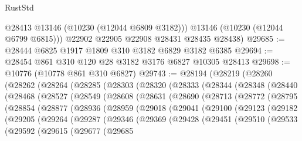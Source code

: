 \begin{lexlean}{RustStd}
\begin{coremodule}
          @28413
          @13146
          (@10230 (@12044 @6809 @3182)))
        @13146
        (@10230 (@12044 @6799 @6815)))
      @22902
      @22905
      @22908
      @28431
      @28435
      @28438)
@29685 := @28444 @6825 @1917 @1809 @310 @3182 @6829 @3182 @6385
@29694 := @28454 @861 @310 @120 @28 @3182 @3176 @6827 @10305 @28413
@29698 := @10776 (@10778 @861 @310 @6827)
@29743 := @28194
    (@28219
      (@28260
        (@28262
          (@28264
            (@28285
              (@28303
                (@28320
                  (@28333
                    (@28344
                      (@28348
                        (@28440
                          (@28468
                            (@28527
                              (@28549
                                (@28608
                                  (@28631
                                    (@28690
                                      (@28713
                                        (@28772
                                          (@28795
                                            (@28854
                                              (@28877
                                                (@28936
                                                  (@28959
                                                    (@29018
                                                      (@29041
                                                        (@29100
                                                          (@29123
                                                            (@29182
                                                              (@29205
                                                                (@29264
                                                                  (@29287
                                                                    (@29346
                                                                      (@29369
                                                                        (@29428
                                                                          (@29451
                                                                            (@29510
                                                                              (@29533
                                                                                (@29592
                                                                                  (@29615
                                                                                    (@29677
                                                                                      (@29685

\end{coremodule}
\end{lexlean}
